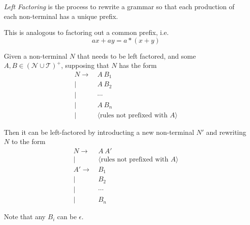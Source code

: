 \begin{definition}
    \textit{Left Factoring} is the process to rewrite a grammar so that each production of each non-terminal has a unique prefix.
    
    This is analogous to factoring out a common prefix, i.e.
    \begin{equation}
        ax + ay = a * (x + y)
    \end{equation}
    
    Given a non-terminal $N$ that needs to be left factored, and some $A, B \in (\mathcal{N} \cup \mathcal{T})^+$, supposing that $N$ has the form
    \begin{equation}
        \begin{aligned}
            N \to  &\ A\ B_1 \\
              \mid &\ A\ B_2 \\
              \mid &\ \cdots \\
              \mid &\ A\ B_n \\
              \mid &\ \langle \text{rules not prefixed with\ } A \rangle
        \end{aligned}
    \end{equation}
    
    Then it can be left-factored by introducting a new non-terminal $N\prime$ and rewriting $N$ to the form
    \begin{equation}
        \begin{aligned}
            N \to  &\ A\ A\prime \\
              \mid &\ \langle \text{rules not prefixed with\ } A \rangle \\
            A\prime \to  &\ B_1 \\
                    \mid &\ B_2 \\
                    \mid &\ \cdots \\
                    \mid &\ B_n
        \end{aligned}
    \end{equation}
    
    Note that any $B_i$ can be $\epsilon$.
\end{definition}


